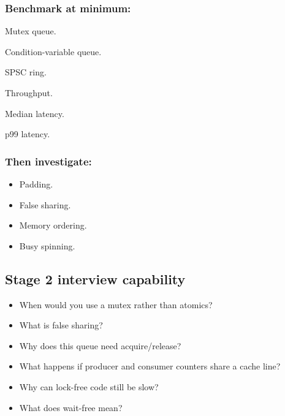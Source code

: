 \documentclass[11pt,letterpaper]{article}
\begin{document}
\subsubsection*{Benchmark at minimum:}

\begin{topics}

\item Mutex queue.

\item Condition-variable queue.

\item SPSC ring.

\item Throughput.

\item Median latency.

\item p99 latency.

\end{topics}

\subsubsection*{Then investigate:}

\begin{itemize}

\item Padding.

\item False sharing.

\item Memory ordering.

\item Busy spinning.

\end{itemize}

\subsection*{Stage 2 interview capability}

\begin{itemize}

\item When would you use a mutex rather than atomics?

\item What is false sharing?

\item Why does this queue need acquire/release?

\item What happens if producer and consumer counters share a cache line?

\item Why can lock-free code still be slow?

\item What does wait-free mean?

\end{itemize}
\end{document}
